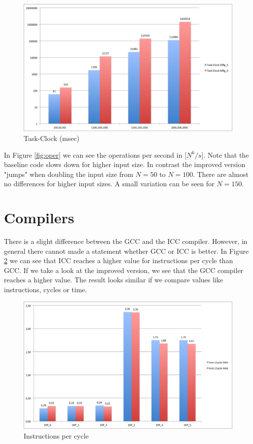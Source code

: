 \documentclass[12pt,a4paper]{article}
\begin{document}
\begin{figure}[h]
	\centering
	\includegraphics[width=1.0\linewidth]{"Benchmark 2/clock"}
	\caption{Task-Clock (msec)}
	\label{fig:clock}
\end{figure}

In Figure \ref{fig:oper} we can see the operations per second in [$N^6/s$]. Note that the baseline code slows down for higher input size. In contrast the improved version "jumps" when doubling the input size from $N=50$ to $N=100$. There are almost no differences for higher input sizes. A small variation can be seen for $N=150$.

\section{Compilers}

There is a slight difference between the GCC and the ICC compiler. However, in general there cannot made a statement whether GCC or ICC is better. In Figure \ref{fig:instrcycle} we can see that ICC reaches a higher value for instructions per cycle than GCC. If we take a look at the improved version, we see that the GCC compiler reaches a higher value. The result looks similar if we compare values like instructions, cycles or time.

\begin{figure}
	\centering
	\includegraphics[width=1.0\linewidth]{"Benchmark/Instrcycle"}
	\caption{Instructions per cycle}
	\label{fig:instrcycle}
\end{figure}
\end{document}
